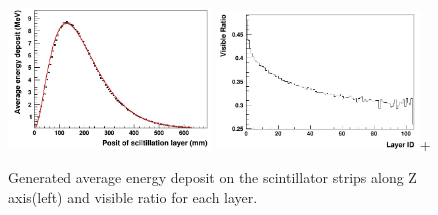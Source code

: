 \documentclass[jkps,preprint,fleqn,showpacs,showkeys]{revtex4}
\begin{document}

\begin{figure}[!hbt]
\includegraphics[width=0.48\textwidth]{figures/LongProfile.jpg}
\includegraphics[width=0.48\textwidth]{figures/LayerVisibleRatio.jpg}+
\caption{Generated average energy deposit on the scintillator strips along Z axis(left) and visible ratio for each layer.}
\label{fig:Longitudinal}
\end{figure}
\end{document}
